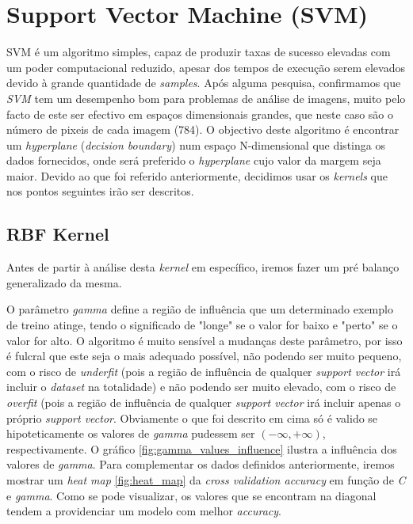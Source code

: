 \section{Support Vector Machine (SVM)}
SVM é um algoritmo simples, capaz de produzir taxas de sucesso elevadas com um poder computacional reduzido, apesar dos tempos de execução serem elevados devido à grande quantidade de \textit{samples}.
Após alguma pesquisa, confirmamos que \textit{SVM} tem um desempenho bom para problemas de análise de imagens, muito pelo facto de este ser efectivo em espaços dimensionais grandes, que neste caso são o número de pixeis de cada imagem (784).
O objectivo deste algoritmo é encontrar um \textit{hyperplane} (\textit{decision boundary}) num espaço N-dimensional que distinga os dados fornecidos, onde será preferido o \textit{hyperplane} cujo valor da margem seja maior.
\newline 
Devido ao que foi referido anteriormente, decidimos usar os \textit{kernels} que nos pontos seguintes irão ser descritos.


\subsection{\textbf{RBF Kernel}}
Antes de partir à análise desta \textit{kernel} em específico, iremos fazer um pré balanço generalizado da mesma.

O parâmetro \textit{gamma} define a região de influência que um determinado exemplo de treino atinge, tendo o significado de "longe" se o valor for baixo e "perto" se o valor for alto.
O algoritmo é muito sensível a mudanças deste parâmetro, por isso é fulcral que este seja o mais adequado possível, não podendo ser muito pequeno, com o risco de \textit{underfit} (pois a região de influência de qualquer \textit{support vector} irá incluir o \textit{dataset} na totalidade) e não podendo ser muito elevado, com o risco de \textit{overfit} (pois a região de influência de qualquer \textit{support vector} irá incluir apenas o próprio \textit{support vector}. Obviamente o que foi descrito em cima só é valido se hipoteticamente os valores de \textit{gamma} pudessem ser $(-\infty, +\infty)$, respectivamente.
O gráfico \ref{fig:gamma_values_influence} ilustra a influência dos valores de \textit{gamma}.
Para complementar os dados definidos anteriormente, iremos mostrar um \textit{heat map} \ref{fig:heat_map} da \textit{cross validation accuracy} em função de \textit{C} e \textit{gamma}. Como se pode visualizar, os valores que se encontram na diagonal tendem a providenciar um modelo com melhor \textit{accuracy}.


